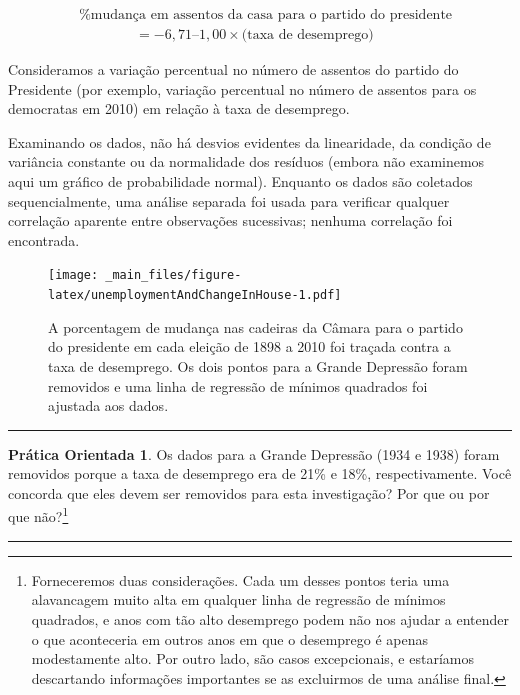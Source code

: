 \documentclass[
]{book}
\theoremstyle{definition}
\theoremstyle{definition}
\theoremstyle{definition}
\newtheorem{exercise}{Prática Orientada}[chapter]
\theoremstyle{definition}
\theoremstyle{remark}
\begin{document}
\begin{align*}
&\text{\% mudança em assentos da casa para o partido do presidente}  \\
&\qquad\qquad= -6,71 – 1,00\times \text{(taxa de desemprego)}
\end{align*}

Consideramos a variação percentual no número de assentos do partido do Presidente (por exemplo, variação percentual no número de assentos para os democratas em 2010) em relação à taxa de desemprego.

Examinando os dados, não há desvios evidentes da linearidade, da condição de variância constante ou da normalidade dos resíduos (embora não examinemos aqui um gráfico de probabilidade normal). Enquanto os dados são coletados sequencialmente, uma análise separada foi usada para verificar qualquer correlação aparente entre observações sucessivas; nenhuma correlação foi encontrada.

\begin{figure}
\centering
\texttt{[image: \_main\_files/figure-latex/unemploymentAndChangeInHouse-1.pdf]}
\caption{\label{fig:unemploymentAndChangeInHouse}A porcentagem de mudança nas cadeiras da Câmara para o partido do presidente em cada eleição de 1898 a 2010 foi traçada contra a taxa de desemprego. Os dois pontos para a Grande Depressão foram removidos e uma linha de regressão de mínimos quadrados foi ajustada aos dados.}
\end{figure}

\begin{center}\rule{0.5\linewidth}{0.5pt}\end{center}

\begin{exercise}
\protect\hypertarget{exr:unnamed-chunk-281}{}{\label{exr:unnamed-chunk-281} }Os dados para a Grande Depressão (1934 e 1938) foram removidos porque a taxa de desemprego era de 21\% e 18\%, respectivamente. Você concorda que eles devem ser removidos para esta investigação? Por que ou por que não?\footnote{Forneceremos duas considerações. Cada um desses pontos teria uma alavancagem muito alta em qualquer linha de regressão de mínimos quadrados, e anos com tão alto desemprego podem não nos ajudar a entender o que aconteceria em outros anos em que o desemprego é apenas modestamente alto. Por outro lado, são casos excepcionais, e estaríamos descartando informações importantes se as excluirmos de uma análise final.}
\end{exercise}

\begin{center}\rule{0.5\linewidth}{0.5pt}\end{center}
\end{document}
